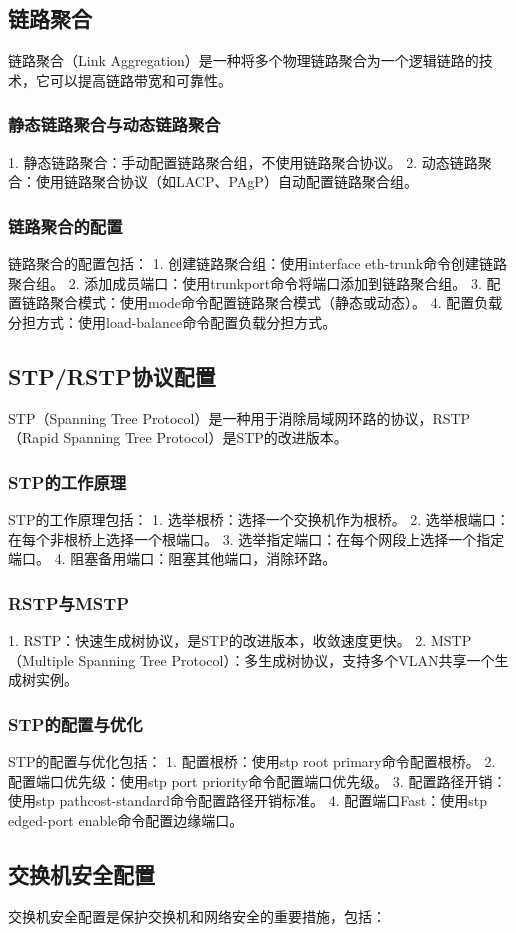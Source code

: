 \documentclass{book}
\begin{document}
\subsection{链路聚合}
链路聚合（Link Aggregation）是一种将多个物理链路聚合为一个逻辑链路的技术，它可以提高链路带宽和可靠性。
\subsubsection{静态链路聚合与动态链路聚合}
1. 静态链路聚合：手动配置链路聚合组，不使用链路聚合协议。
2. 动态链路聚合：使用链路聚合协议（如LACP、PAgP）自动配置链路聚合组。
\subsubsection{链路聚合的配置}
链路聚合的配置包括：
1. 创建链路聚合组：使用interface eth-trunk命令创建链路聚合组。
2. 添加成员端口：使用trunkport命令将端口添加到链路聚合组。
3. 配置链路聚合模式：使用mode命令配置链路聚合模式（静态或动态）。
4. 配置负载分担方式：使用load-balance命令配置负载分担方式。
\subsection{STP/RSTP协议配置}
STP（Spanning Tree Protocol）是一种用于消除局域网环路的协议，RSTP（Rapid Spanning Tree Protocol）是STP的改进版本。
\subsubsection{STP的工作原理}
STP的工作原理包括：
1. 选举根桥：选择一个交换机作为根桥。
2. 选举根端口：在每个非根桥上选择一个根端口。
3. 选举指定端口：在每个网段上选择一个指定端口。
4. 阻塞备用端口：阻塞其他端口，消除环路。
\subsubsection{RSTP与MSTP}
1. RSTP：快速生成树协议，是STP的改进版本，收敛速度更快。
2. MSTP（Multiple Spanning Tree Protocol）：多生成树协议，支持多个VLAN共享一个生成树实例。
\subsubsection{STP的配置与优化}
STP的配置与优化包括：
1. 配置根桥：使用stp root primary命令配置根桥。
2. 配置端口优先级：使用stp port priority命令配置端口优先级。
3. 配置路径开销：使用stp pathcost-standard命令配置路径开销标准。
4. 配置端口Fast：使用stp edged-port enable命令配置边缘端口。
\subsection{交换机安全配置}
交换机安全配置是保护交换机和网络安全的重要措施，包括：
\end{document}

